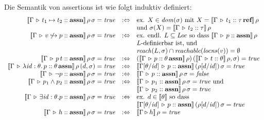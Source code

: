 \documentclass[12pt,a4paper,bigheadings]{scrartcl}
\newcommand{\semantic}[1]{\ensuremath{\llbracket#1\rrbracket}}
\newcommand{\assn}{\ensuremath{\mathbf{assn}}}
\newcommand{\atype}[1]{#1\,\assn}
\newcommand{\locns}{\name{locns}}
\renewcommand{\disjoint}[2]{\ensuremath{#2\not\hookrightarrow#1}}
\begin{document}
\pagebreak[3] \noindent
Die Semantik von assertions ist wie folgt induktiv definiert:
\[\begin{array}{rcl}
  \semantic{\Tj{\Gamma}{t_1\mapsto t_2}{\assn}}\,\rho\,\sigma = \true
  & :\Leftrightarrow &
  \text{ex. } X\in\dom{\sigma} \text{ mit } X = \semantic{\Tj{\Gamma}{t_1}{\reftype{\tau}}}\,\rho \\
  && \text{und } \sigma(X) = \semantic{\Tj{\Gamma}{t_2}{\tau}}\,\rho
  \\
  \semantic{\Tj{\Gamma}{\disjoint{p}{v}}{\assn}}\,\rho\,\sigma = \true
  & :\Leftrightarrow &
  \text{ex. endl. } L \subseteq \Loc \text{ so dass } \semantic{\Tj{\Gamma}{p}{\assn}}\,\rho \\
  && \text{$L$-definierbar ist, und } \\
  && \name{reach}(L,\sigma) \cap \name{reachable}(\locns(v))=\emptyset
  \\
  \semantic{\Tj{\Gamma}{\app{p}{t}}{\assn}}\,\rho\,\sigma = \true
  & :\Leftrightarrow &
  (\semantic{\Tj{\Gamma}{p}{\atype{\theta}}}\,\rho)\,(\semantic{\Tj{\Gamma}{t}{\theta}}\,\rho,\sigma)=\true
  \\
  \semantic{\Tj{\Gamma}{\abstr{\id:\theta}{p}}{\atype{\theta}}}\,\rho\,(d,\sigma) = \true
  & :\Leftrightarrow &
  \semantic{\Tj{\Gamma[\theta/\id]}{p}{\assn}}\,(\rho[d/\id])\,\sigma = \true
  \\
  \semantic{\Tj{\Gamma}{\neg p}{\assn}}\,\rho\,\sigma = \true
  & :\Leftrightarrow &
  \semantic{\Tj{\Gamma}{p}{\assn}}\,\rho\,\sigma = \false
  \\
  \semantic{\Tj{\Gamma}{p_1 \wedge p_2}{\assn}}\,\rho\,\sigma = \true
  & :\Leftrightarrow &
  \semantic{\Tj{\Gamma}{p_1}{\assn}}\,\rho\,\sigma = \true \text{ und } \\
  && \semantic{\Tj{\Gamma}{p_2}{\assn}}\,\rho\,\sigma = \true
  \\
  \semantic{\Tj{\Gamma}{\exists \id:\theta.p}{\assn}}\,\rho\,\sigma = \true
  & :\Leftrightarrow &
  \text{ex. } d\in\semantic{\theta} \text{ so dass } \\
  && \semantic{\Tj{\Gamma[\theta/\id]}{p}{\assn}}\,(\rho[d/\id])\,\sigma = \true
  \\
  \semantic{\Tj{\Gamma}{h}{\assn}}\,\rho\,\sigma = \true
  & :\Leftrightarrow &
  \semantic{\Tjh{\Gamma}{h}}\,\rho = \true
\end{array}\]
\end{document}
